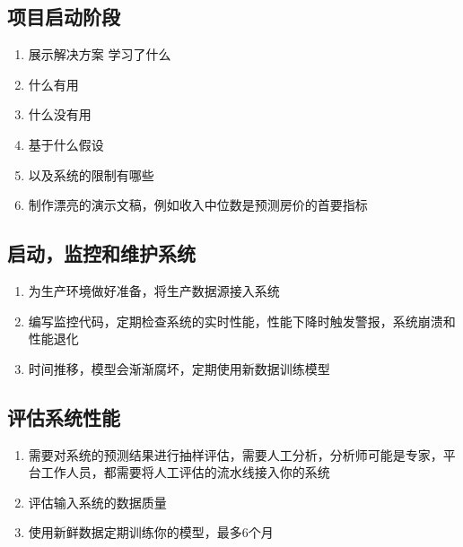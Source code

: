 \documentclass[11pt]{article}
\providecommand{\tightlist}{%
      \setlength{\itemsep}{0pt}\setlength{\parskip}{0pt}}
\begin{document}
    \hypertarget{ux9879ux76eeux542fux52a8ux9636ux6bb5}{%
\subsection{项目启动阶段}\label{ux9879ux76eeux542fux52a8ux9636ux6bb5}}

\begin{enumerate}
\def\labelenumi{\arabic{enumi}.}
\tightlist
\item
  展示解决方案 学习了什么
\item
  什么有用
\item
  什么没有用
\item
  基于什么假设
\item
  以及系统的限制有哪些
\item
  制作漂亮的演示文稿，例如收入中位数是预测房价的首要指标
\end{enumerate}

\hypertarget{ux542fux52a8ux76d1ux63a7ux548cux7ef4ux62a4ux7cfbux7edf}{%
\subsection{启动，监控和维护系统}\label{ux542fux52a8ux76d1ux63a7ux548cux7ef4ux62a4ux7cfbux7edf}}

\begin{enumerate}
\def\labelenumi{\arabic{enumi}.}
\tightlist
\item
  为生产环境做好准备，将生产数据源接入系统
\item
  编写监控代码，定期检查系统的实时性能，性能下降时触发警报，系统崩溃和性能退化
\item
  时间推移，模型会渐渐腐坏，定期使用新数据训练模型
\end{enumerate}

\hypertarget{ux8bc4ux4f30ux7cfbux7edfux6027ux80fd}{%
\subsection{评估系统性能}\label{ux8bc4ux4f30ux7cfbux7edfux6027ux80fd}}

\begin{enumerate}
\def\labelenumi{\arabic{enumi}.}
\tightlist
\item
  需要对系统的预测结果进行抽样评估，需要人工分析，分析师可能是专家，平台工作人员，都需要将人工评估的流水线接入你的系统
\item
  评估输入系统的数据质量
\item
  使用新鲜数据定期训练你的模型，最多6个月
\end{enumerate}
\end{document}
